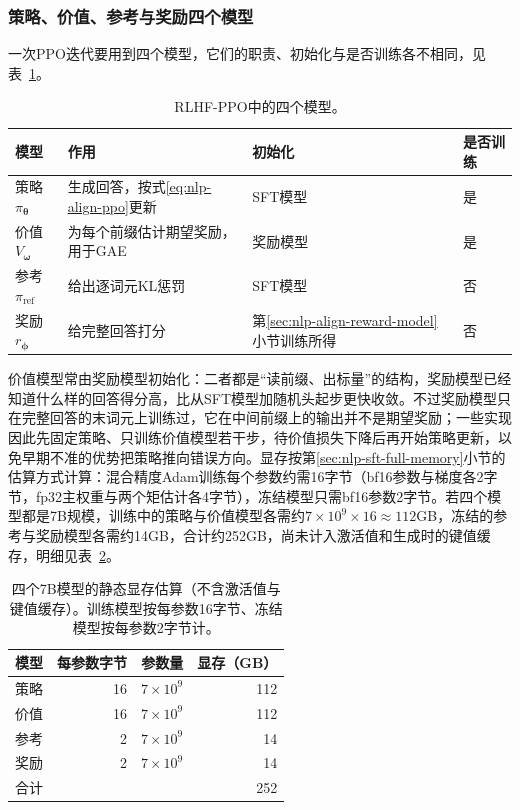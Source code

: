 \subsubsection{策略、价值、参考与奖励四个模型}
\label{sec:nlp-align-ppo-models}

一次PPO迭代要用到四个模型，它们的职责、初始化与是否训练各不相同，见表~\ref{tab:nlp-align-ppo-models}。

\begin{table}[htbp]
  \centering
  \small
  \caption{RLHF-PPO中的四个模型。}
  \label{tab:nlp-align-ppo-models}
  \begin{tabularx}{\linewidth}{@{}lXll@{}}
    \toprule
    模型 & 作用 & 初始化 & 是否训练\\
    \midrule
    策略$\pi_{\bm\theta}$ & 生成回答，按式\eqref{eq:nlp-align-ppo}更新 & SFT模型 & 是\\
    价值$V_{\bm\omega}$ & 为每个前缀估计期望奖励，用于GAE & 奖励模型 & 是\\
    参考$\pi_{\mathrm{ref}}$ & 给出逐词元KL惩罚 & SFT模型 & 否\\
    奖励$r_{\bm\phi}$ & 给完整回答打分 & 第\ref{sec:nlp-align-reward-model}小节训练所得 & 否\\
    \bottomrule
  \end{tabularx}
\end{table}

价值模型常由奖励模型初始化：二者都是“读前缀、出标量”的结构，奖励模型已经知道什么样的回答得分高，比从SFT模型加随机头起步更快收敛。不过奖励模型只在完整回答的末词元上训练过，它在中间前缀上的输出并不是期望奖励；一些实现因此先固定策略、只训练价值模型若干步，待价值损失下降后再开始策略更新，以免早期不准的优势把策略推向错误方向。显存按第\ref{sec:nlp-sft-full-memory}小节的估算方式计算：混合精度Adam训练每个参数约需16字节（bf16参数与梯度各2字节，fp32主权重与两个矩估计各4字节），冻结模型只需bf16参数2字节。若四个模型都是7B规模，训练中的策略与价值模型各需约$7\times10^9\times16\approx112$GB，冻结的参考与奖励模型各需约14GB，合计约252GB，尚未计入激活值和生成时的键值缓存，明细见表~\ref{tab:nlp-align-ppo-memory}。

\begin{table}[htbp]
  \centering
  \small
  \caption{四个7B模型的静态显存估算（不含激活值与键值缓存）。训练模型按每参数16字节、冻结模型按每参数2字节计。}
  \label{tab:nlp-align-ppo-memory}
  \begin{tabular}{@{}lrrr@{}}
    \toprule
    模型 & 每参数字节 & 参数量 & 显存（GB）\\
    \midrule
    策略 & 16 & $7\times10^9$ & 112\\
    价值 & 16 & $7\times10^9$ & 112\\
    参考 & 2 & $7\times10^9$ & 14\\
    奖励 & 2 & $7\times10^9$ & 14\\
    \midrule
    合计 & & & 252\\
    \bottomrule
  \end{tabular}
\end{table}


